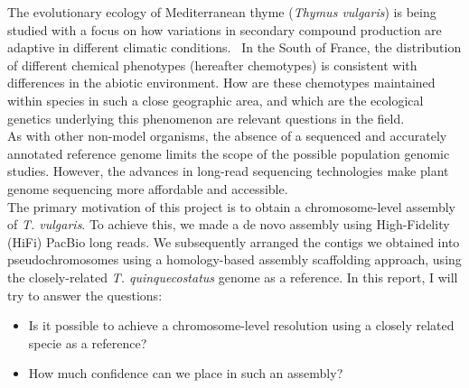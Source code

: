 The evolutionary ecology of Mediterranean thyme (\textit{Thymus vulgaris}) is being studied with a focus on how variations in secondary compound production are adaptive in different climatic conditions.~\cite{thompsonBibliography2020} In the South of France, the distribution of different chemical phenotypes (hereafter chemotypes) is consistent with differences in the abiotic environment. How are these chemotypes maintained within species in such a close geographic area, and which are the ecological genetics underlying this phenomenon are relevant questions in the field.~\cite{bataillonGenotypePhenotypeGenetic2022}\\

As with other non-model organisms, the absence of a sequenced and accurately annotated reference genome limits the scope of the possible population genomic studies. However, the advances in long-read sequencing technologies make plant genome sequencing more affordable and accessible.~\cite{puckerPlantGenomeSequence2022} \\

The primary motivation of this project is to obtain a chromosome-level assembly of \textit{T. vulgaris}. To achieve this, we made a de novo assembly using High-Fidelity (HiFi) PacBio long reads. We subsequently arranged the contigs we obtained into pseudochromosomes using a homology-based assembly scaffolding approach, using the closely-related \textit{T. quinquecostatus} genome as a reference. In this report, I will try to answer the questions:

\begin{itemize}
    \item Is it possible to achieve a chromosome-level resolution using a closely related specie as a reference?
    \item How much confidence can we place in such an assembly?
\end{itemize}

